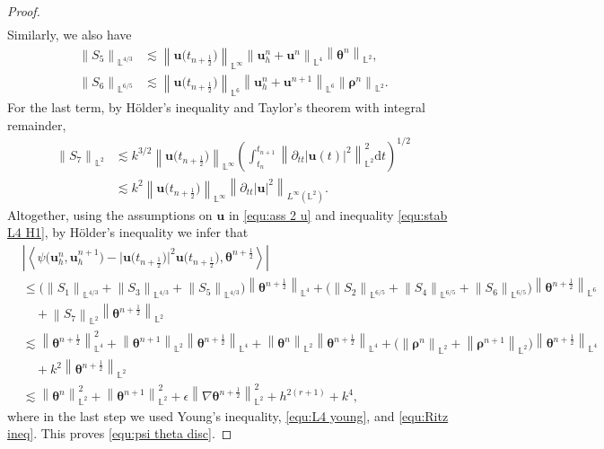 \documentclass[11pt, reqno]{amsart}
\theoremstyle{definition}
\theoremstyle{remark}
\numberwithin{equation}{section}
\newcommand{\bff}{\boldsymbol}
\newcommand{\bb}{\mathbb}
\newcommand{\dt}{\mathrm{d}t}
\newcommand{\norm}[2]{\left\|{#1}\right\|_{#2}}
\newcommand{\inpro}[2]{\left\langle#1,#2\right\rangle}
\newcommand{\abs}[1]{\left|{#1}\right|}
\begin{document}
\begin{proof}
\begin{align*}
\end{align*}
Similarly, we also have
\begin{align*}
	\norm{S_5}{\bb{L}^{4/3}}
	&\lesssim
	\norm{\bff{u}\big(t_{n+\frac{1}{2}}\big)}{\bb{L}^\infty} \norm{\bff{u}_h^n+ \bff{u}^n}{\bb{L}^4} \norm{\bff{\theta}^n}{\bb{L}^2},
	\\
	\norm{S_6}{\bb{L}^{6/5}}
	&\lesssim
	\norm{\bff{u}\big(t_{n+\frac{1}{2}}\big)}{\bb{L}^6} \norm{\bff{u}_h^n+ \bff{u}^{n+1}}{\bb{L}^6} \norm{\bff{\rho}^n}{\bb{L}^2}.
\end{align*}
For the last term, by H\"older's inequality and Taylor's theorem with integral remainder,
\begin{align}\label{equ:psi S7}
	\nonumber
	\norm{S_7}{\bb{L}^2}
	&\lesssim
	k^{3/2} \norm{\bff{u}\big(t_{n+\frac{1}{2}}\big)}{\bb{L}^\infty} \left(\int_{t_n}^{t_{n+1}} \norm{\partial_{tt} \abs{\bff{u}(t)}^2}{\bb{L}^2}^2 \dt \right)^{1/2}
	\\
	&\lesssim
	k^2 \norm{\bff{u}\big(t_{n+\frac{1}{2}}\big)}{\bb{L}^\infty} \norm{\partial_{tt} \abs{\bff{u}}^2}{L^\infty(\bb{L}^2)}.
\end{align}
Altogether, using the assumptions on $\bff{u}$ in \eqref{equ:ass 2 u} and inequality \eqref{equ:stab L4 H1}, by H\"older's inequality we infer that
\begin{align*}
	&\left| \inpro{\psi\big(\bff{u}_h^n, \bff{u}_h^{n+1}\big) - \big|\bff{u}\big(t_{n+\frac{1}{2}}\big)\big|^2 \bff{u}\big(t_{n+\frac{1}{2}}\big)}{\bff{\theta}^{n+\frac{1}{2}}} \right| 
	\\
	&\leq
	\big(\norm{S_1}{\bb{L}^{4/3}} +
	\norm{S_3}{\bb{L}^{4/3}} + \norm{S_5}{\bb{L}^{4/3}}\big) \norm{\bff{\theta}^{n+\frac{1}{2}}}{\bb{L}^4}
	+
	\big( \norm{S_2}{\bb{L}^{6/5}} + \norm{S_4}{\bb{L}^{6/5}} + \norm{S_6}{\bb{L}^{6/5}}\big) \norm{\bff{\theta}^{n+\frac{1}{2}}}{\bb{L}^6}
	\\
	&\quad 
	+
	\norm{S_7}{\bb{L}^2} \norm{\bff{\theta}^{n+\frac{1}{2}}}{\bb{L}^2}
	\\
	&\lesssim
	\norm{\bff{\theta}^{n+\frac{1}{2}}}{\bb{L}^4}^2
	+
	\norm{\bff{\theta}^{n+1}}{\bb{L}^2} \norm{\bff{\theta}^{n+\frac{1}{2}}}{\bb{L}^4}
	+
	\norm{\bff{\theta}^n}{\bb{L}^2} \norm{\bff{\theta}^{n+\frac{1}{2}}}{\bb{L}^4}
	+
	\big( \norm{\bff{\rho}^n}{\bb{L}^2} + \norm{\bff{\rho}^{n+1}}{\bb{L}^2} \big) \norm{\bff{\theta}^{n+\frac{1}{2}}}{\bb{L}^4}
	\\
	&\quad
	+
	k^2 \norm{\bff{\theta}^{n+\frac{1}{2}}}{\bb{L}^2}
	\\
	&\lesssim
	\norm{\bff{\theta}^n}{\bb{L}^2}^2 + \norm{\bff{\theta}^{n+1}}{\bb{L}^2}^2 
	+
	\epsilon \norm{\nabla \bff{\theta}^{n+\frac{1}{2}}}{\bb{L}^2}^2
	+
	h^{2(r+1)} + k^4,
\end{align*}
where in the last step we used Young's inequality, \eqref{equ:L4 young}, and \eqref{equ:Ritz ineq}. This proves \eqref{equ:psi theta disc}.


\end{proof}
\end{document}
